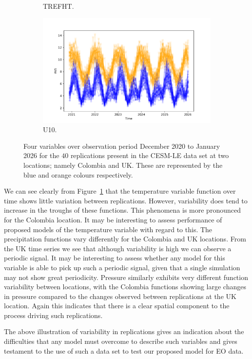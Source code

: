 \begin{figure}[htbp!]
\begin{subfigure}[b]{0.45\textwidth}
		\caption{TREFHT.}
		\label{fig:std_temp_temp}   
	\end{subfigure}             
	\begin{subfigure}[b]{0.45\textwidth}
		\includegraphics[width=\textwidth]{U10_std_temp}
		\caption{U10.}
		\label{fig:std_wind_temp}
	\end{subfigure}             
	\caption[Temporal overview of variability of Precipitation, Pressure, Temperature, and Wind speed from the CESM-LE dataset.]{ Four variables over observation period December 2020 to January 2026 for the $40$ replications present in the CESM-LE data set at two locations; namely Colombia and UK. These are represented by the blue and orange colours respectively.}
	\label{fig:std_overview_temp}
\end{figure}

We can see clearly from Figure~\ref{fig:std_temp_temp} that the temperature variable function over time shows little variation between replications. 
However, variability does tend to increase in the troughs of these functions. 
This phenomena is more pronounced for the Colombia location. 
It may be interesting to assess performance of proposed models of the temperature variable with regard to this.
The precipitation functions vary differently for the Colombia and UK locations.
From the UK time series we see that although variability is high we can observe a periodic signal. 
It may be interesting to assess whether any model for this variable is able to pick up such a periodic signal, given that a single simulation may not show great periodicity.
Pressure similarly exhibits very different function variability between locations, with the Colombia functions showing large changes in pressure compared to the changes observed between replications at the UK location. 
Again this indicates that there is a clear spatial component to the process driving such replications. 

The above illustration of variability in replications gives an indication about the difficulties that any model must overcome to describe such variables and gives testament to the use of such a data set to test our proposed model for EO data.